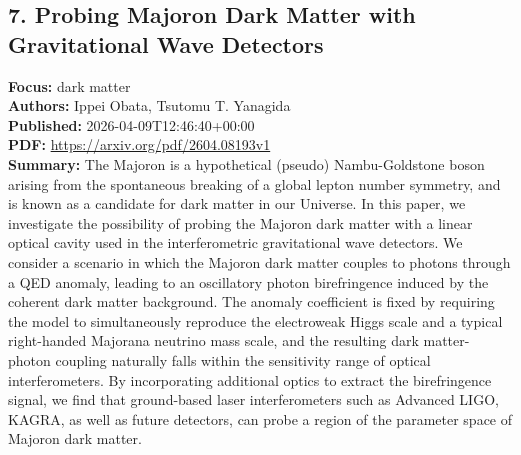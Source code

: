 \documentclass[11pt]{article}
\begin{document}
\subsection*{7. Probing Majoron Dark Matter with Gravitational Wave Detectors}
\textbf{Focus:} dark matter\\
\textbf{Authors:} Ippei Obata, Tsutomu T. Yanagida\\
\textbf{Published:} 2026-04-09T12:46:40+00:00\\
\textbf{PDF:} \href{https://arxiv.org/pdf/2604.08193v1}{https://arxiv.org/pdf/2604.08193v1}\\
\textbf{Summary:}
The Majoron is a hypothetical (pseudo) Nambu-Goldstone boson arising from the spontaneous breaking of a global lepton number symmetry, and is known as a candidate for dark matter in our Universe. In this paper, we investigate the possibility of probing the Majoron dark matter with a linear optical cavity used in the interferometric gravitational wave detectors. We consider a scenario in which the Majoron dark matter couples to photons through a QED anomaly, leading to an oscillatory photon birefringence induced by the coherent dark matter background. The anomaly coefficient is fixed by requiring the model to simultaneously reproduce the electroweak Higgs scale and a typical right-handed Majorana neutrino mass scale, and the resulting dark matter-photon coupling naturally falls within the sensitivity range of optical interferometers. By incorporating additional optics to extract the birefringence signal, we find that ground-based laser interferometers such as Advanced LIGO, KAGRA, as well as future detectors, can probe a region of the parameter space of Majoron dark matter.
\newpage
\end{document}
